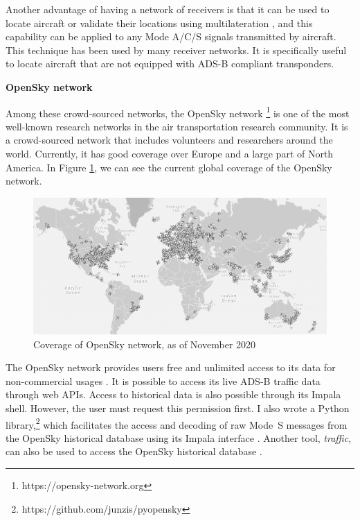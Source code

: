 Another advantage of having a network of receivers is that it can be used to locate aircraft or validate their locations using multilateration \cite{kaune2012}, and this capability can be applied to any Mode A/C/S signals transmitted by aircraft. This technique has been used by many receiver networks. It is specifically useful to locate aircraft that are not equipped with ADS-B compliant transponders.

{\large\textbf{OpenSky network}}

Among these crowd-sourced networks, the OpenSky network \footnote{https://opensky-network.org} is one of the most well-known research networks in the air transportation research community. It is a crowd-sourced network that includes volunteers and researchers around the world. Currently, it has good coverage over Europe and a large part of North America. In Figure \ref{fig:opensky_coverage}, we can see the current global coverage of the OpenSky network.

\begin{figure}[ht]
    \centering
    \includegraphics[width=\columnwidth]{figures/conclusion/opensky.png}
    \caption{Coverage of OpenSky network, as of November 2020}
    \label{fig:opensky_coverage}
\end{figure}

The OpenSky network provides users free and unlimited access to its data for non-commercial usages \cite{schafer2014opensky}. It is possible to access its live ADS-B traffic data through web APIs. Access to historical data is also possible through its Impala shell. However, the user must request this permission first. I also wrote a Python library,\footnote{https://github.com/junzis/pyopensky} which facilitates the access and decoding of raw Mode~S messages from the OpenSky historical database using its Impala interface \cite{sun2019pyopensky}. Another tool, \emph{traffic}, can also be used to access the OpenSky historical database \cite{olive2019}.

